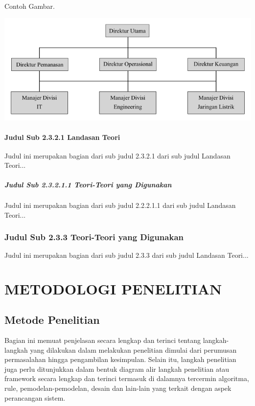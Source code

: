 \documentclass[oneside,listof=totoc]{scrbook}
\begin{document}
\noindent Contoh Gambar.

\vspace{0.5cm}

\begin{center}
  \begin{minipage}{\textwidth}
    \label{gambar:2.1}
    \includegraphics[width=14.5cm]{gambar/gambar_2_1.png}
    \vspace{-0.5cm}
  \end{minipage}
\end{center}

\subsubsection{Judul Sub 2.3.2.1 Landasan Teori}
Judul ini merupakan bagian dari sub judul 2.3.2.1 dari sub judul Landasan Teori...

\paragraph{Judul Sub 2.3.2.1.1 Teori-Teori yang Digunakan}
Judul ini merupakan bagian dari sub judul 2.2.2.1.1 dari sub judul Landasan Teori...

\subsection{Judul Sub 2.3.3 Teori-Teori yang Digunakan}
Judul ini merupakan bagian dari sub judul 2.3.3 dari sub judul Landasan Teori...

\chapter{METODOLOGI PENELITIAN}

\vspace{0.5cm}

\section{Metode Penelitian}
Bagian ini memuat penjelasan secara lengkap dan terinci tentang langkah-langkah yang dilakukan dalam melakukan penelitian dimulai dari perumusan permasalahan hingga pengambilan kesimpulan. Selain itu, langkah penelitian juga perlu ditunjukkan dalam bentuk diagram alir langkah penelitian atau framework secara lengkap dan terinci termasuk di dalamnya tercermin algoritma, rule, pemodelan-pemodelan, desain dan lain-lain yang terkait dengan aspek perancangan sistem.
\end{document}
